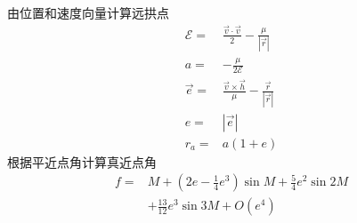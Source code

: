 由位置和速度向量计算远拱点
\begin{align*}
    \mathcal{E} =& \frac{\vec{v}\cdot\vec{v}}{2}
     - \frac{\mu}{|\vec{r}|} \\
    a =& -\frac{\mu}{2\mathcal{E}} \\
    \vec{e} =& \frac{\vec{v}\times\vec{h}}{\mu}
     - \frac{\vec{r}}{|\vec{r}|} \\
    e =& |\vec{e}| \\
    r_a =& a(1+e)
\end{align*}
根据平近点角计算真近点角\cite{msmart1977}
\begin{align*}
    f =& M+\left(2e-{\frac {1}{4}}e^{3}\right)\sin {M}
    + {\frac {5}{4}}e^{2}\sin {2M} \\
    &+ {\frac {13}{12}}e^{3}\sin {3M}+O(e^{4})
\end{align*}

